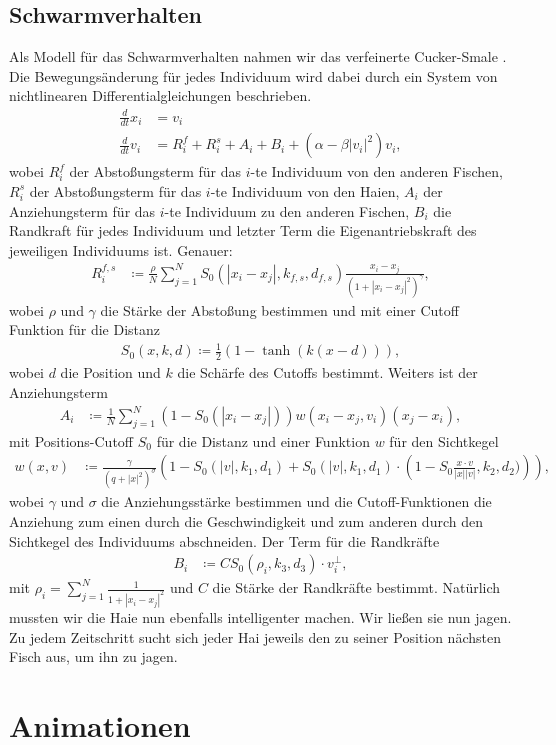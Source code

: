 \documentclass[a4paper,11pt]{article}
\theoremstyle{definition}
\numberwithin{equation}{section}
\begin{document}
	\subsection{Schwarmverhalten}
Als Modell für das Schwarmverhalten nahmen wir das verfeinerte Cucker-Smale \cite{agueh2011analysis}.
Die Bewegungsänderung für jedes Individuum wird dabei durch ein System von nichtlinearen Differentialgleichungen beschrieben.
	\begin{align*}
		\frac{d}{dt}x_i &= v_i\\
		\frac{d}{dt}v_i &= R^f_i + R^s_i + A_i  + B_i + (\alpha - \beta |v_i|^2)v_i,
	\end{align*}
	wobei $R^f_i$ der Abstoßungsterm für das $i$-te Individuum von den anderen Fischen, $R^s_i$ der Abstoßungsterm für das $i$-te Individuum von den Haien, $A_i$ der Anziehungsterm für das $i$-te Individuum zu den anderen Fischen, $B_i$ die Randkraft für jedes Individuum und letzter Term die Eigenantriebskraft des jeweiligen Individuums ist. \newline
	Genauer:
	\begin{align*}
		R^{f,s}_i &\coloneqq \frac{\rho}{N}\sum^N_{j=1} S_0(|x_i-x_j|, k_{f,s}, d_{f,s})\frac{x_i-x_j}{\left(1+|x_i-x_j|^2\right)^{\gamma}},
	\end{align*}
	wobei $\rho$ und $\gamma$ die Stärke der Abstoßung bestimmen und mit einer Cutoff Funktion für die Distanz
	\begin{align*}
		S_0(x, k, d) \coloneqq \frac{1}{2}(1-\tanh(k(x-d))),
	\end{align*}
wobei $d$ die Position und $k$ die Schärfe des Cutoffs bestimmt. Weiters ist der Anziehungsterm
\begin{align*}
		A_i &\coloneqq \frac{1}{N}\sum^N_{j = 1} (1-S_0(|x_i - x_j|))w(x_i - x_j, v_i)(x_j - x_i), 
	\end{align*}
	mit Positions-Cutoff $S_0$ für die Distanz und einer Funktion $w$ für den Sichtkegel
	\begin{align*}
		w(x,v) &\coloneqq \frac{\gamma}{(q+|x|^2)^{\sigma}}\left(1-S_0(|v|, k_1, d_1) + S_0(|v|, k_1, d_1)\cdot\left(1-S_0\frac{x\cdot v}{|x||v|}, k_2, d_2)\right)\right),
	\end{align*}
	wobei $\gamma$ und $\sigma$ die Anziehungsstärke bestimmen und die Cutoff-Funktionen die Anziehung zum einen durch die Geschwindigkeit und zum anderen durch den Sichtkegel des Individuums abschneiden.
	Der Term für die Randkräfte
	\begin{align*}
		B_i &\coloneqq CS_0(\rho_i, k_3, d_3)\cdot v_i^\perp, 
	\end{align*}
	mit $\rho_i = \sum^N_{j = 1} \frac{1}{1+|x_i-x_j|^2}$ und $C$ die Stärke der Randkräfte bestimmt.
	Natürlich mussten wir die Haie nun ebenfalls intelligenter machen. Wir ließen sie nun jagen. Zu jedem Zeitschritt sucht sich jeder Hai jeweils den zu seiner Position nächsten Fisch aus, um ihn zu jagen.

	\section{Animationen}
	
	\listoffigures
	


	\nocite{*}
	
\end{document}
